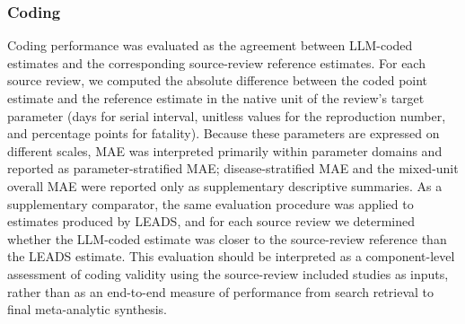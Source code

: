 \subsubsection{Coding}

Coding performance was evaluated as the agreement between LLM-coded estimates and the corresponding source-review reference estimates. For each source review, we computed the absolute difference between the coded point estimate and the reference estimate in the native unit of the review's target parameter (days for serial interval, unitless values for the reproduction number, and percentage points for fatality). Because these parameters are expressed on different scales, MAE was interpreted primarily within parameter domains and reported as parameter-stratified MAE; disease-stratified MAE and the mixed-unit overall MAE were reported only as supplementary descriptive summaries. As a supplementary comparator, the same evaluation procedure was applied to estimates produced by LEADS, and for each source review we determined whether the LLM-coded estimate was closer to the source-review reference than the LEADS estimate. This evaluation should be interpreted as a component-level assessment of coding validity using the source-review included studies as inputs, rather than as an end-to-end measure of performance from search retrieval to final meta-analytic synthesis.
